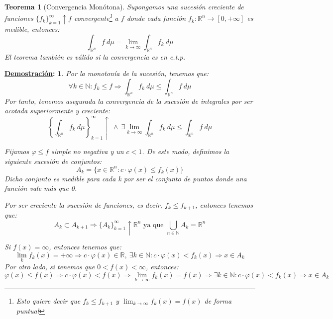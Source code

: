 \documentclass[10pt,a4paper,openright]{book}
\theoremstyle{break}
\newtheorem*{theo}{Teorema}
\newtheorem*{demo}{\underline{Demostración}:}
\begin{document}
\begin{theo}[Convergencia Monótona]
Supongamos una sucesión creciente de funciones $\{f_k\}_{k=1}^\infty \uparrow f$ convergente\footnote{Esto quiere decir que $f_k \leq f_{k+1}$ y $\lim_{k\rightarrow\infty} f_k(x) = f(x)$ de forma puntual} a $f$ donde cada función $f_k: \mathbb{R}^n \rightarrow \left[0, +\infty\right]$ es medible, entonces:
$$\int_{\mathbb{R}^n}f \ d \mu = \lim_{k\rightarrow\infty} \int_{\mathbb{R}^n} f_k \ d \mu$$
El teorema también es válido si la convergencia es en c.t.p.
\end{theo}
\begin{demo}
Por la monotonía de la sucesión, tenemos que:
$$\forall k \in \mathbb{N}: f_k \le f \Rightarrow \int_{\mathbb{R}^n} f_k \ d \mu \le \int_{\mathbb{R}^n} f \ d \mu$$
Por tanto, tenemos asegurada la convergencia de la sucesión de integrales por ser acotada superiormente y creciente:
$$\left\lbrace \int_{\mathbb{R}^n} f_k \ d \mu \right\rbrace_{k=1}^{\infty}\uparrow \ \wedge \ \exists \lim_{k\rightarrow\infty} \int_{\mathbb{R}^n} f_k \ d \mu \le \int_{\mathbb{R}^n}f \ d \mu$$

Fijamos $\varphi \le f$ simple no negativa y un $c < 1$. De este modo, definimos la siguiente sucesión de conjuntos:
$$A_k = \{x \in \mathbb{R}^n: c\cdot \varphi\left(x\right) \leq f_k\left(x\right)\}$$
Dicho conjunto es medible para cada k por ser el conjunto de puntos donde una función vale más que 0.

Por ser creciente la sucesión de funciones, es decir, $f_k \le f_{k+1}$, entonces tenemos que:
$$A_k \subset A_{k+1} \Rightarrow \{A_k\}_{k=1}^{\infty} \uparrow \mathbb{R}^n \mbox{ ya que }\bigcup_{n\in \mathbb{N}}A_k = \mathbb{R}^n$$

Si $f(x) = \infty$, entonces tenemos que:
$$\lim_k f_k \left(x\right) = +\infty \Rightarrow c\cdot \varphi\left(x\right) \in \mathbb{R},\ \exists k \in \mathbb{N} : c\cdot \varphi\left(x\right) < f_k\left(x\right) \Rightarrow x \in A_k$$
Por otro lado, si tenemos que $0 < f\left(x\right) < \infty $, entonces:
$$\varphi\left(x\right) \le f\left(x\right) \Rightarrow c\cdot \varphi\left(x\right) < f\left(x\right) \Rightarrow \lim_{k\rightarrow\infty} f_k\left(x\right) = f\left(x\right) \Rightarrow \exists k \in \mathbb{N} : c\cdot \varphi\left(x\right) < f_k\left(x\right)\Rightarrow x\in A_k$$


\end{demo}
\end{document}
